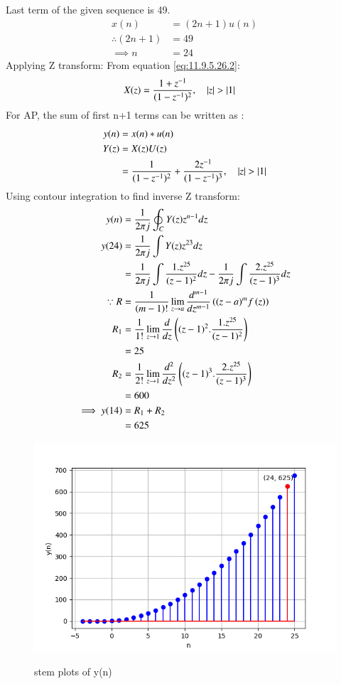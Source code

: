 \documentclass[journal,12pt,twocolumn]{IEEEtran}
\theoremstyle{remark}
\begin{document}
Last term of the given sequence is 49.
\begin{align}
 x(n) &= (2n+1)u(n) \\
 \therefore ( 2n +1 ) &= 49 \\
\implies n &= 24 
\end{align}
Applying Z transform:
From equation \eqref{eq:11.9.5.26.2}:
\begin{align}
   X(z) &= \frac{1+z^{-1}}{(1-z^{-1})^2},  \quad \left\vert z\right\vert > \left\vert1\right\vert  
\end{align}
For AP, the sum of first n+1 terms can be written as :
\begin{align}
y(n)&=x(n)*u(n) \\
Y(z) &= X(z)U(z)\\
 &=\frac{1}{(1-z^{-1})^2} + \frac{2z^{-1}}{(1-z^{-1})^3}, \quad \left\vert z\right\vert > \left\vert1\right\vert 
\end{align}
Using contour integration to find inverse Z transform:
\begin{align}
y(n) &= \frac{1}{2\pi j} \oint_C Y(z) z^{n-1} dz\\
y(24) &= \frac{1}{2\pi j}\int Y(z) z^{23} dz \\
 &= \frac{1}{2\pi j}\int \frac{1.z^{25}}{(z-1)^{2}} dz - \frac{1}{2\pi j}\int \frac{2.z^{25}}{(z-1)^{3}} dz\\
 \because R&=\frac{1}{\left(m-1\right)!}\lim\limits_{z\to a}\frac{d^{m-1}}{dz^{m-1}}\left({(z-a)}^{m}f\left(z\right)\right)\\
 R_1 &=\frac{1}{1!}\lim\limits_{z\to 1}\frac{d}{dz}\left((z-1)^2.\frac{1.z^{25}}{(z-1)^{2}}\right)\\
 &= 25\\
 R_2 &=\frac{1}{2!}\lim\limits_{z\to 1}\frac{d^2}{dz^2}\left((z-1)^3.\frac{2.z^{25}}{(z-1)^{3}}\right)\\
 &= 600\\
 \implies y(14) &= R_1 + R_2 \\
&= 625
\end{align}
\begin{figure}[h!]
\centering
\includegraphics[width=\columnwidth]{figs/stem_plot.png}
\label{fig:plot}
\caption{stem plots of y(n)}
\end{figure}
\end{document}
